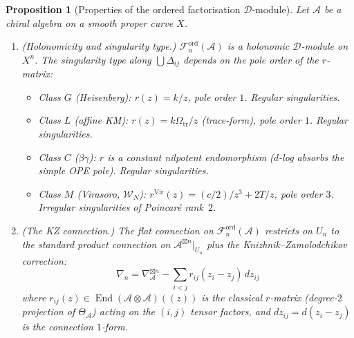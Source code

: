 \documentclass[11pt,reqno]{amsart}
\newtheorem{proposition}[theorem]{Proposition}
\theoremstyle{definition}
\theoremstyle{remark}
\newcommand{\cA}{\mathcal{A}}
\newcommand{\cD}{\mathcal{D}}
\newcommand{\cF}{\mathcal{F}}
\newcommand{\cW}{\mathcal{W}}
\DeclareMathOperator{\End}{End}
\numberwithin{equation}{section}
\begin{document}
\begin{proposition}[Properties of the ordered
factorisation $\cD$-module]
\label{prop:fact-dmod-props}
Let $\cA$ be a chiral algebra on a smooth proper curve $X$.
\begin{enumerate}[label=\textup{(\roman*)}]
\item \textup{(Holonomicity and singularity type.)}
  $\cF_n^{\mathrm{ord}}(\cA)$ is a holonomic
  $\cD$-module on $X^n$.
  The singularity type along $\bigcup \Delta_{ij}$ depends
  on the pole order of the $r$-matrix:
  \begin{itemize}
  \item \textup{Class $G$ \textup{(}Heisenberg\textup{)}:}
    $r(z) = k/z$, pole order $1$. Regular singularities.
  \item \textup{Class $L$ \textup{(}affine KM\textup{)}:}
    $r(z) = k\Omega_{\mathrm{tr}}/z$ \textup{(}trace-form\textup{)},
    pole order $1$. Regular singularities.
  \item \textup{Class $C$ \textup{(}$\beta\gamma$\textup{)}:}
    $r$ is a constant nilpotent endomorphism
    \textup{(}$d$-log absorbs the simple OPE pole\textup{)}.
    Regular singularities.
  \item \textup{Class $M$ \textup{(}Virasoro, $\cW_N$\textup{)}:}
    $r^{\mathrm{Vir}}(z) = (c/2)/z^3 + 2T/z$,
    pole order $3$. \emph{Irregular} singularities
    of Poincar\'e rank~$2$.
  \end{itemize}
\item \textup{(The KZ connection.)}
  The flat connection on $\cF_n^{\mathrm{ord}}(\cA)$
  restricts on $U_n$ to the standard product connection
  on $\cA^{\boxtimes n}|_{U_n}$ plus the
  Knizhnik--Zamolodchikov correction:
  \begin{equation}\label{eq:kz-conn}
    \nabla_n
    = \nabla_{\cA}^{\boxtimes n}
    - \sum_{i < j}
    r_{ij}(z_i - z_j) \, dz_{ij}
  \end{equation}
  where $r_{ij}(z) \in \End(\cA \otimes \cA)((z))$
  is the classical $r$-matrix \textup{(}degree-$2$
  projection of $\Theta_\cA$\textup{)} acting on the
  $(i,j)$ tensor factors, and
  $dz_{ij} = d(z_i - z_j)$ is the connection $1$-form.


\end{enumerate}
\end{proposition}
\end{document}
